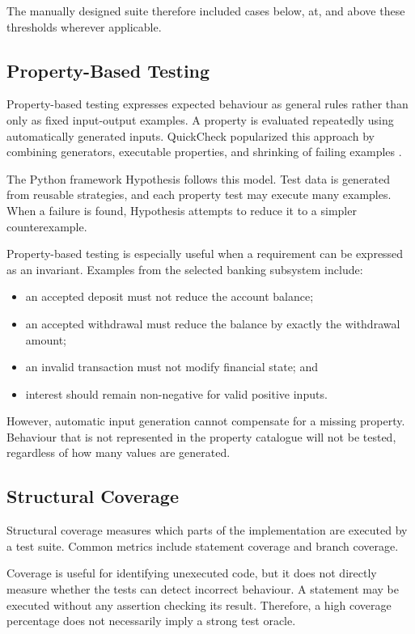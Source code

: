 \documentclass[12pt]{article}
\begin{document}
The manually designed suite therefore included cases below, at, and above
these thresholds wherever applicable.

\subsection{Property-Based Testing}

Property-based testing expresses expected behaviour as general rules rather
than only as fixed input-output examples. A property is evaluated repeatedly
using automatically generated inputs. QuickCheck popularized this approach by
combining generators, executable properties, and shrinking of failing
examples \cite{hughes2010quickcheck}.

The Python framework Hypothesis follows this model. Test data is generated
from reusable strategies, and each property test may execute many examples.
When a failure is found, Hypothesis attempts to reduce it to a simpler
counterexample.

Property-based testing is especially useful when a requirement can be
expressed as an invariant. Examples from the selected banking subsystem
include:

\begin{itemize}
    \item an accepted deposit must not reduce the account balance;
    \item an accepted withdrawal must reduce the balance by exactly the
          withdrawal amount;
    \item an invalid transaction must not modify financial state; and
    \item interest should remain non-negative for valid positive inputs.
\end{itemize}

However, automatic input generation cannot compensate for a missing property.
Behaviour that is not represented in the property catalogue will not be tested,
regardless of how many values are generated.

\subsection{Structural Coverage}

Structural coverage measures which parts of the implementation are executed by
a test suite. Common metrics include statement coverage and branch coverage.

Coverage is useful for identifying unexecuted code, but it does not directly
measure whether the tests can detect incorrect behaviour. A statement may be
executed without any assertion checking its result. Therefore, a high coverage
percentage does not necessarily imply a strong test oracle.
\end{document}
